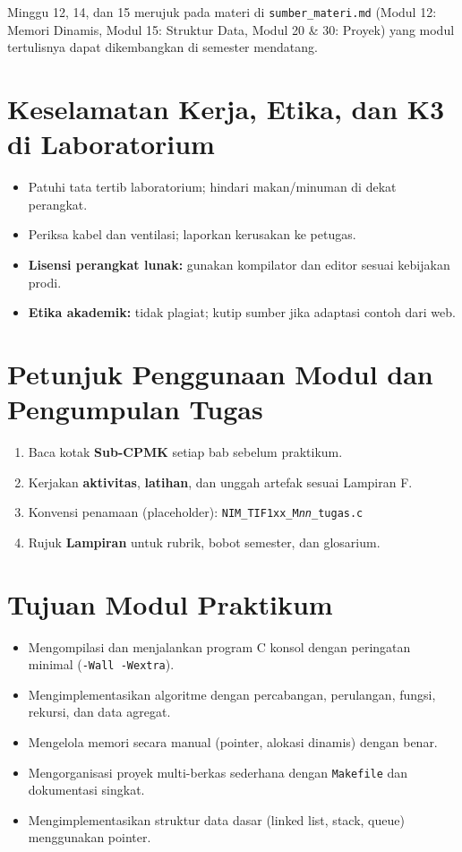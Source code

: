 \documentclass[../main.tex]{subfiles}
\begin{document}
\begin{catatan}
Minggu 12, 14, dan 15 merujuk pada materi di \texttt{sumber\_materi.md} (Modul 12: Memori Dinamis, Modul 15: Struktur Data, Modul 20 \& 30: Proyek) yang modul tertulisnya dapat dikembangkan di semester mendatang.
\end{catatan}

\section{Keselamatan Kerja, Etika, dan K3 di Laboratorium}

\begin{itemize}[leftmargin=*]
  \item Patuhi tata tertib laboratorium; hindari makan/minuman di dekat perangkat.
  \item Periksa kabel dan ventilasi; laporkan kerusakan ke petugas.
  \item \textbf{Lisensi perangkat lunak:} gunakan kompilator dan editor sesuai kebijakan prodi.
  \item \textbf{Etika akademik:} tidak plagiat; kutip sumber jika adaptasi contoh dari web.
\end{itemize}

\section{Petunjuk Penggunaan Modul dan Pengumpulan Tugas}

\begin{enumerate}[leftmargin=*]
  \item Baca kotak \textbf{Sub-CPMK} setiap bab sebelum praktikum.
  \item Kerjakan \textbf{aktivitas}, \textbf{latihan}, dan unggah artefak sesuai Lampiran F.
  \item Konvensi penamaan (placeholder): \texttt{NIM\_TIF1xx\_M\textit{nn}\_tugas.c}
  \item Rujuk \textbf{Lampiran} untuk rubrik, bobot semester, dan glosarium.
\end{enumerate}

\section{Tujuan Modul Praktikum}

\begin{itemize}[leftmargin=*]
  \item Mengompilasi dan menjalankan program C konsol dengan peringatan minimal (\texttt{-Wall -Wextra}).
  \item Mengimplementasikan algoritme dengan percabangan, perulangan, fungsi, rekursi, dan data agregat.
  \item Mengelola memori secara manual (pointer, alokasi dinamis) dengan benar.
  \item Mengorganisasi proyek multi-berkas sederhana dengan \texttt{Makefile} dan dokumentasi singkat.
  \item Mengimplementasikan struktur data dasar (linked list, stack, queue) menggunakan pointer.
\end{itemize}
\end{document}

